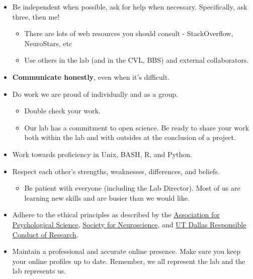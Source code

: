 \documentclass[
]{book}
\providecommand{\tightlist}{%
  \setlength{\itemsep}{0pt}\setlength{\parskip}{0pt}}
\begin{document}
\begin{itemize}
\tightlist
\item
  Be independent when possible, ask for help when necessary. Specifically, ask three, then me!

  \begin{itemize}
  \tightlist
  \item
    There are lots of web resources you should consult - StackOverflow, NeuroStars, etc\\
  \item
    Use others in the lab (and in the CVL, BBS) and external collaborators.\\
  \end{itemize}
\item
  \textbf{Communicate honestly}, even when it's difficult.\\
\item
  Do work we are proud of individually and as a group.

  \begin{itemize}
  \tightlist
  \item
    Double check your work.\\
  \item
    Our lab has a commitment to open science. Be ready to share your work both within the lab and with outsides at the conclusion of a project.
  \end{itemize}
\item
  Work towards proficiency in Unix, BASH, R, and Python.
\item
  Respect each other's strengths, weaknesses, differences, and beliefs.

  \begin{itemize}
  \tightlist
  \item
    Be patient with everyone (including the Lab Director). Most of us are learning new skills and are busier than we would like.
  \end{itemize}
\item
  Adhere to the ethical principles as described by the \href{https://www.apa.org/ethics/code/}{Association for Psychological Science}, \href{https://www.sfn.org/Membership/Professional-Conduct/SfN-Ethics-Policy}{Society for Neuroscience}, and \href{https://research.utdallas.edu/orio/rcr}{UT Dallas Responsible Conduct of Research}.
\item
  Maintain a professional and accurate online presence. Make sure you keep your online profiles up to date. Remember, we all represent the lab and the lab represents us.
\end{itemize}
\end{document}
